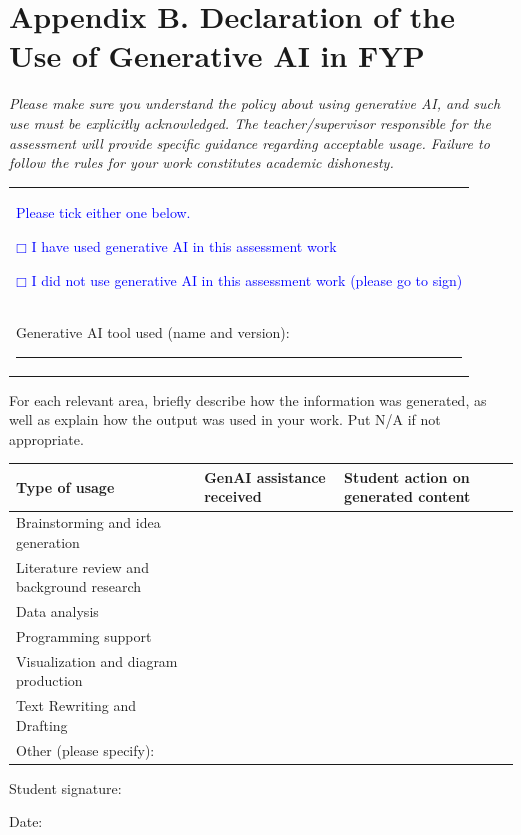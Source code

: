 \documentclass[11pt,a4paper]{article}
\newcommand{\blue}[1]{\textcolor{blue}{#1}}
\begin{document}
\clearpage
{}
{}
\section*{Appendix B. Declaration of the Use of Generative AI in FYP}

\textit{Please make sure you understand the policy about using generative AI, and such use must be explicitly acknowledged. The teacher/supervisor responsible for the assessment will provide specific guidance regarding acceptable usage. Failure to follow the rules for your work constitutes academic dishonesty.}

\begingroup
{}
\begin{tabular}{p{14.6cm}}
\blue{Please tick either one below.}\par
\blue{$\mdlgwhtsquare$  \quad\quad I have used generative AI in this assessment work}\par
\blue{$\mdlgwhtsquare$  \quad\quad I did not use generative AI in this assessment work (please go to sign)}\\
Generative AI tool used (name and version): \rule{8cm}{0.4pt}\\[0.5cm]
\end{tabular}
\endgroup

For each relevant area, briefly describe how the information was generated, as well as explain how the output was used in your work. Put N/A if not appropriate.

\begingroup
{}
\renewcommand{\arraystretch}{1.2}
\begin{tabular}{|>{\raggedright\arraybackslash}p{4.2cm}|p{4.32cm}|p{6.02cm}|}
\hline
\cellcolor{shade}Type of usage & \cellcolor{shade}GenAI assistance received & \cellcolor{shade}Student action on generated content \\[0.2cm] \hline
Brainstorming and idea generation & & \\[0.8cm] \hline
Literature review and background research & & \\[0.6cm] \hline
Data analysis & & \\[0.6cm] \hline
Programming support & & \\[0.6cm] \hline
Visualization and diagram production & & \\[0.6cm] \hline
Text Rewriting and Drafting & & \\[0.6cm] \hline
Other (please specify): & & \\[0.6cm] \hline
\end{tabular}
\endgroup

\vspace{1cm}
Student signature: 

Date:
\end{document}
